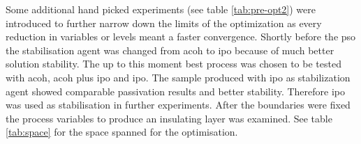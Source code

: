Some additional hand picked experiments (see table \ref{tab:pre-opt2}) were introduced to further narrow down the limits of 
the optimization as every reduction in variables or levels meant a faster convergence.
Shortly before the \gls{pso} the stabilisation agent was changed from \gls{acoh} to 
\gls{ipo} because of much better solution stability.
The up to this moment best process was chosen to be tested with  \gls{acoh},  \gls{acoh} plus  \gls{ipo} and  \gls{ipo}.
The sample produced with \gls{ipo} as stabilization agent showed comparable passivation results and better stability. Therefore \gls{ipo} was used  as stabilisation in further experiments.
After 
the boundaries were fixed the process variables to 
produce an insulating layer was examined. 
See table \ref{tab:space} for the space spanned for the optimisation.
